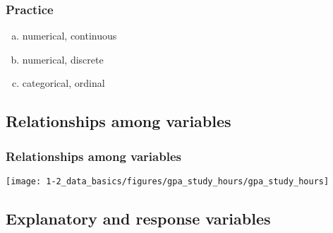 
\begin{frame}
\frametitle{Practice}


\begin{enumerate}[(a)]
\item numerical, continuous
\item numerical, discrete
\item categorical, ordinal
\end{enumerate}

\end{frame}


\subsection{Relationships among variables}


\begin{frame}
\frametitle{Relationships among variables}


\begin{center}
\texttt{[image: 1-2\_data\_basics/figures/gpa\_study\_hours/gpa\_study\_hours]}
\end{center}

\pause



\end{frame}


\subsection{Explanatory and response variables}


